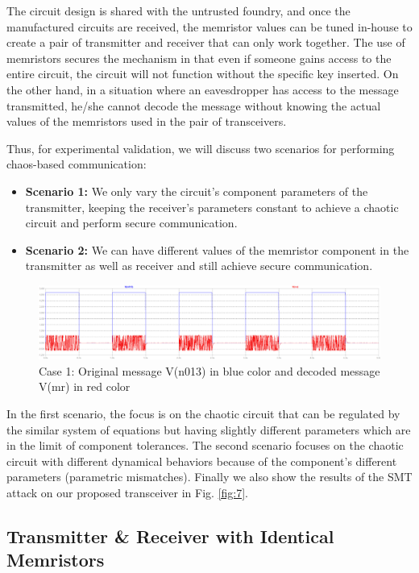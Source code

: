 The circuit design is shared with the untrusted foundry, and once the manufactured circuits are received, the memristor values can be tuned in-house to create a pair of transmitter and receiver that can only work together. The use of memristors secures the mechanism in that even if someone gains access to the entire circuit, the circuit will not function without the specific key inserted. On the other hand, in a situation where an eavesdropper has access to the message transmitted, he/she cannot decode the message without knowing the actual values of the memristors used in the pair of transceivers. 

Thus, for experimental validation, we will discuss two scenarios for performing chaos-based communication:
\begin{itemize}
\item \textbf{Scenario 1:} We only vary the circuit's component parameters of the transmitter, keeping the receiver's parameters constant to achieve a chaotic circuit and perform secure communication.
\item \textbf{Scenario 2:} We can have different values of the memristor component in the transmitter as well as receiver and still achieve secure communication.
\end{itemize}

\begin{figure}[!t]
    \centering
    \includegraphics[width = 0.8\linewidth]{figs/Fig15U11_1_6K.PNG}
    \caption{Case 1: Original message V(n013) in blue color and decoded message V(mr) in red color}
    \label{fig:9}
\end{figure}

In the first scenario, the focus is on the chaotic circuit that can be regulated by the similar system of equations but having slightly different parameters which are in the limit of component tolerances. The second scenario focuses on the chaotic circuit with different dynamical behaviors because of the component's different parameters (parametric mismatches). Finally we also show the results of the SMT attack on our proposed transceiver in Fig. \ref{fig:7}.

\subsection*{Transmitter \& Receiver with Identical Memristors}

